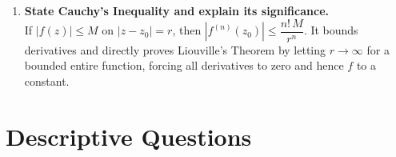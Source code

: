 \documentclass[12pt,a4paper]{article}
\begin{document}
\begin{enumerate}[label=\textbf{Q\arabic*.}, leftmargin=*]
  \item \textbf{State Cauchy's Inequality and explain its significance.}\\
  If $|f(z)| \leq M$ on $|z - z_0| = r$, then $|f^{(n)}(z_0)| \leq \dfrac{n!\,M}{r^n}$.
  It bounds derivatives and directly proves Liouville's Theorem by letting $r \to \infty$
  for a bounded entire function, forcing all derivatives to zero and hence $f$ to a constant.

\end{enumerate}

\section{Descriptive Questions}
\end{document}
